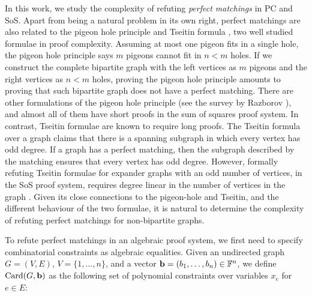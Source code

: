 \documentclass[11pt]{article}
\begin{document}
In this work, we study the complexity of refuting \emph{perfect matchings} in PC and SoS.
Apart from being a natural problem in its own right, perfect matchings are also related to the pigeon hole principle \citep{maciel2000new, pitassi1993exponential, raz2004resolution, razbarov2002pgp, razborov2003resolution} and Tseitin formula \citep{filmus2013towards, galesi2019bounded, glinskih2017satisfiable, grigoriev2001linear}, two well studied formulae in proof complexity.
Assuming at most one pigeon fits in a single hole, the pigeon hole principle says $m$ pigeons cannot fit in $n < m$ holes.
If we construct the complete bipartite graph with the left vertices as $m$ pigeons and the right vertices as $n < m$ holes, proving the pigeon hole principle amounts to proving that such bipartite graph does not have a perfect matching.
There are other formulations of the pigeon hole principle (see the survey by Razborov \citep{razbarov2002pgp}), and almost all of them have short proofs in the sum of squares proof system.
In contrast, Tseitin formulae are known to require long proofs. The Tseitin formula over a graph claims that there is a spanning subgraph in which every vertex has odd degree.
If a graph has a perfect matching, then the subgraph described by the matching ensures that every vertex has odd degree.
However, formally refuting Tseitin formulae for expander graphs with an odd number of vertices, in the SoS proof system, requires degree linear in the number of vertices in the graph \cite{grigoriev2001linear}.
Given its close connections to the pigeon-hole and Tseitin, and the different behaviour of the two formulae, it is natural to determine the complexity of refuting perfect matchings for non-bipartite graphs.

To refute perfect matchings in an algebraic proof system, we first need to specify combinatorial constraints as algebraic equalities. Given an undirected graph $G=(V,E)$, $V = \{1, \ldots, n\}$, and a vector $\mathbf{b} = (b_1, \ldots, b_{n}) \in \mathbb{F}^{n}$,
we define $\text{Card}(G, \mathbf{b})$ as the following set of polynomial constraints over variables $x_e$ for $e \in E$:
\end{document}
